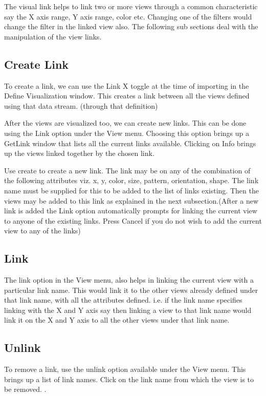 The visual link helps to link two or more views through a common
characteristic say the X axis range, Y axis range, color
etc. Changing one of the filters would change the filter in the
linked view also. The following sub sections deal with the
manipulation of the view links.

\subsection{Create Link}

To create a link, we can use the Link X toggle at the time of
importing in the Define Visualization window. This creates a link
between all the views defined using that data stream. (through that
definition)

After the views are visualized too, we can create new links. This can
be done using the Link option under the View menu. Choosing this
option brings up a GetLink window that lists all the current links
available. Clicking on Info brings up the views linked together by the
chosen link.

Use create to create a new link. The link may be on any of the
combination of the following attributes viz. x, y, color, size,
pattern, orientation, shape. The link name must be supplied for this
to be added to the list of links existing. Then the views may be added
to this link as explained in the next subsection.(After a new link is
added the Link option automatically prompts for linking the current
view to anyone of the existing links. Press Cancel if you do not wish
to add the current view to any of the links)

\subsection{Link}

The link option in the View menu, also helps in linking the current
view with a particular link name. This would link it to the other
views already defined under that link name, with all the attributes
defined. i.e. if the link name specifies linking with the X and Y axis
say then linking a view to that link name would link it on the X and Y
axis to all the other views under that link name.

\subsection{Unlink}

To remove a link, use the unlink option available under the View
menu. This brings up a list of link names. Click on the link name from
which the view is to be removed.  .

